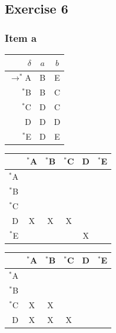 {\subsection{Exercise 6}
\subsubsection{Item a}
\begin{center} \begin{tabular}{r | c c}
	$\delta$ & $a$ & $b$ \\ \hline
	$\rightarrow^*$A  & B  & E  \\
	$^*$B  & B  & C  \\
	$^*$C  & D  & C  \\
	D      & D  & D  \\
	$^*$E  & D  & E  
\end{tabular} \end{center}
\begin{center} \begin{tabular}{r || c | c | c | c | c}
	       & $^*$A  & $^*$B  & $^*$C & D  & $^*$E  \\ \hline \hline
	$^*$A  & \cellcolor{gray} & \cellcolor{gray} & \cellcolor{gray} & \cellcolor{gray} & \cellcolor{gray} \\ \hline
	$^*$B  &    & \cellcolor{gray} & \cellcolor{gray} & \cellcolor{gray} & \cellcolor{gray} \\ \hline
	$^*$C  &    &    & \cellcolor{gray} & \cellcolor{gray} & \cellcolor{gray} \\ \hline
	D      & X  & X  & X  & \cellcolor{gray} & \cellcolor{gray} \\ \hline
	$^*$E  &    &    &    & X  & \cellcolor{gray}
\end{tabular} \end{center}
\begin{center} \begin{tabular}{r || c | c | c | c | c}
	       & $^*$A  & $^*$B  & $^*$C & D  & $^*$E  \\ \hline \hline
	$^*$A  & \cellcolor{gray} & \cellcolor{gray} & \cellcolor{gray} & \cellcolor{gray} & \cellcolor{gray} \\ \hline
	$^*$B  &    & \cellcolor{gray} & \cellcolor{gray} & \cellcolor{gray} & \cellcolor{gray} \\ \hline
	$^*$C  & X  & X  & \cellcolor{gray} & \cellcolor{gray} & \cellcolor{gray} \\ \hline
	D      & X  & X  & X  & \cellcolor{gray} & \cellcolor{gray} \\ \hline

\end{tabular}
\end{center}}
